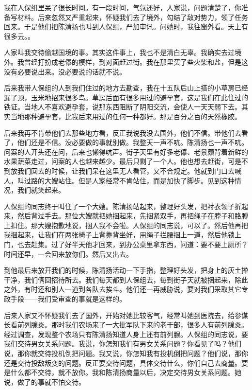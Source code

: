  我在人保组里呆了很长时间。有一段时间，气氛还好，人家说，问题清楚了，你准备写材料。后来忽然又严重起来，怀疑我们去了境外，勾结了敌对势力，领了任务回来。于是他们把陈清扬也叫到人保组，严加审讯。问她时，我往窗外看。天上有很多云。。 
 
 人家叫我交待偷越国境的事。其实这件事上，我也不是清白无辜。我确实去过境外。我曾经打扮成老傣的模样，到对面赶过街。我在那里买了些火柴和盐，但是这没有必要说出来。没必要说的话就不说。 
 
 后来我带人保组的人到我们住过的地方去勘查，我在十五队后山上搭的小草房已经漏了顶，玉米地招来很多鸟。草房后面有很多用过的避孕套，这是我们在此住过的铁证。当地人不喜欢避孕套，说那东西阻断了阴阳交流，会使人一天天弱下去。其实当地那种避孕套，比我后来用过的任何一种都好。那是百分之百的天然橡胶。 
 
 后来我再不肯带他们去那些地方看，反正我说我没去国外，他们不信。带他们去看了，他们还是不信。没必要做的事就别做。我整天一声不吭。陈清扬也一声不吭。问案的人开头还在问，后来也懒得吭声。街子天里有好多老傣、老景颇背着新鲜的水果蔬菜走过，问案的人也越来越少。最后只剩了一个人。他也想去赶街，可是不到放我们回去的时候，让我们呆在这里无人看管，又不合规定。他就到门口去喊人，叫过路的大嫂站住。但是人家经常不肯站住，而是加快了脚步。见到这种情况，我们就笑起来。 
 
 人保组的同志终于叫住了一个大嫂。陈清扬站起来，整理好头发，把衬衣领子折起来，然后背过手去。那位大嫂就把她捆起来，先捆紧双手，再把绳子在脖子和胳膊上扣住。那大嫂抱歉地说，捆人我不会啦。人保组的同志说，可以了。然后他再把我捆起来，让我们在两张椅子上背靠背坐好，用绳子拦腰捆上一道，然后他锁上门，也去赶集。过了好半天他才回来，到办公桌里拿东西，问道：要不要上厕所？时间还早，一会回来放你们。然后又出去。 
 
 到他最后来放开我们的时候，陈清扬活动一下手指，整理好头发，把身上的灰土掸干净，我们俩回招待所去。我们每天都到人保组去，每到街子天就被捆起来，除此之外，有时还和别人一道到各队去挨斗。他们还一再威胁说，要对我们采取其它专政手段——我们受审查的事就是这样的。 
 
 后来人家又不怀疑我们去了国外，开始对她比较客气，经常叫她到医院去，给参谋长看前列腺炎。那时我们农场来了一大批军队下来的老干部，很多人有前列腺炎。经过调查，发现整个农场只有陈清扬知道人身上还有前列腺。人保组的同志说，要我们交待男女关系问题。我说，你怎知我们有男女关系问题？你看见了吗？他们说，那你就交待投机倒把问题。我又说，你怎知我有投机倒把问题？他们说，那你还是交待投敌叛变的问题。反正要交待问题，具体交待什么，你们自己去商量。要是什么都不交待，就不放你。我和陈清扬商量以后，决定交待男女关系问题。她说，做了的事就不怕交待。 
 
